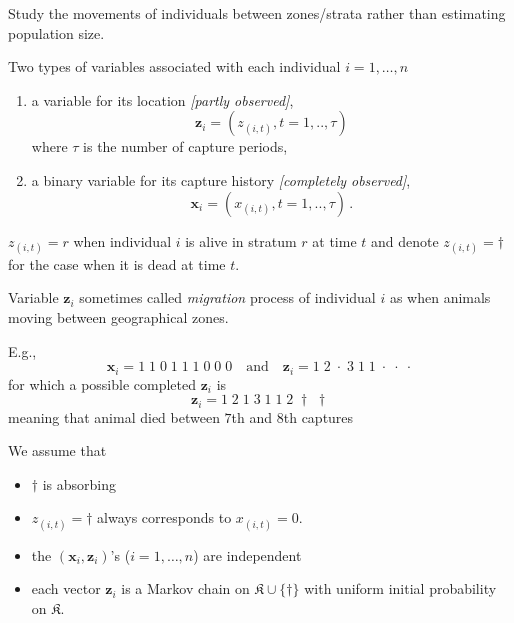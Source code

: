 \begin{slide}
\end{slide}\begin{slide}

Study the movements of individuals between zones/strata rather than estimating
population size.

\vs\pause
Two types of variables associated with each individual $i=1,\ldots,n$

\begin{enumerate}
\item a variable for its location {\em [partly observed]},
$$
\mathbf{z}_i =(z_{(i,t)},t=1,..,\tau)
$$
where $\tau$ is the number of capture periods, 
\item a binary variable for its capture history {\em [completely observed]},
$$
\mathbf{x}_i=(x_{(i,t)},t=1,..,\tau)\,.
$$
\end{enumerate}

\end{slide}\begin{slide}

$z_{(i,t)}=r$ when individual $i$ is alive in stratum $r$ at time $t$ 
and denote $z_{(i,t)}=\dag$ for the case when it is dead at time $t$.

\vs\pause Variable $\mathbf{z}_i$ sometimes called {\em migration} process of
individual $i$ as when animals moving between geographical zones.

\vs\pause
E.g., 
$$
{\mathbf x}_i = 1 \; 1 \; 0 \; 1 \; 1 \; 1\; 0 \; 0 \; 0
\quad
\text{and}
\quad
{\mathbf z}_i = 1 \; 2 \; \cdot \; 3 \; 1 \; 1 \; \cdot \; \cdot \; \cdot
$$
for which a possible completed ${\mathbf z}_i$ is
$$
{\mathbf z}_i = 1 \; 2 \; 1 \; 3 \; 1 \; 1 \; 2\; \dag \; \dag
$$
meaning that animal died between $7$th and $8$th captures 

\end{slide}\begin{slide}

We assume that 
\begin{itemize}
\item $\dag$ is absorbing
\item $z_{(i,t)} =\dag$ always corresponds to $x_{(i,t)}=0$.
\item the $({\mathbf x}_i,{\mathbf z}_i)$'s ($i=1,\ldots,n$) are independent 
\item each vector ${\mathbf z}_i$ is a Markov chain on
$\mathfrak{K}\cup\{\dag\}$ with uniform initial probability on $\mathfrak{K}$.
\end{itemize}


\end{slide}
